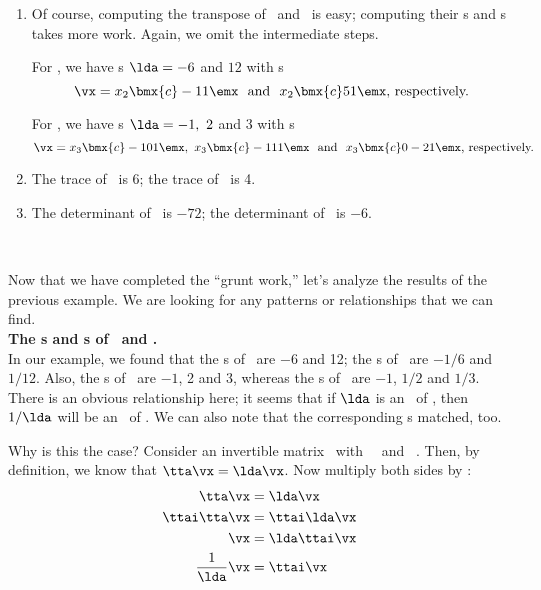 {\begin{enumerate}
	\item		Of course, computing the transpose of \tta\ and \ttb\ is easy; computing their \el s and \ev s takes more work. Again, we omit the intermediate steps.
	
	For \ttat, we have \el s $\lda = -6$ and $12$ with \ev s 
\[
\vx = x_2 \bmx{c} -1\\1\emx\ \text{ and }\  x_2 \bmx{c} 5\\1\emx \text{, respectively.}
\]
	
	For \ttbt, we have \el s $\lda = -1,\ 2$ and $3$ with \ev s 
\[
\vx = x_3 \bmx{c} -1\\0\\1\emx,\ x_3 \bmx{c} -1\\1\\1\emx\ \text{ and }\ x_3\bmx{c} 0\\-2\\1\emx\text{, respectively.}
\]
	
	\item		The trace of \tta\ is 6; the trace of \ttb\ is 4.
	
	\item		The determinant of \tta\ is $-72$; the determinant of \ttb\ is $-6$.
	
\end{enumerate}
\ }

\medskip

Now that we have completed the ``grunt work,'' let's analyze the results of the previous example. We are looking for any patterns or relationships that we can find.\\

\noindent \textsf{\textbf{The \el s and \ev s of \tta\ and \ttai.}} \\

In our example, we found that the \el s of \tta\ are $-6$ and 12; the \el s of \ttai\ are $-1/6$ and $1/12$. Also, the \el s of \ttb\ are $-1$, 2 and 3, whereas the \el s of \ttbi\ are $-1$, $1/2$ and $1/3$. There is an obvious relationship here; it seems that if $\lda$ is an \el\ of \tta, then $1/\lda$ will be an \el\ of \ttai. We can also note that the corresponding \ev s matched, too.

Why is this the case? Consider an invertible matrix \tta\ with \el\ \lda\ and \ev\ \vx. Then, by definition, we know that $\tta\vx = \lda\vx$. Now multiply both sides by \ttai:
\begin{align*}
\tta\vx & = \lda\vx \\
\ttai\tta\vx & = \ttai\lda\vx \\
\vx & = \lda\ttai\vx \\
\frac{1}{\lda}\vx & = \ttai\vx 
\end{align*}

